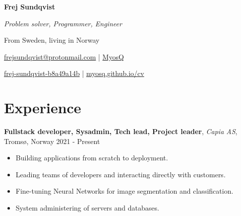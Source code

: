 \documentclass[11pt, a4paper]{article}
\begin{document}
\noindent
\begin{minipage}{0.25\textwidth}

\end{minipage}%
\begin{minipage}{0.75\textwidth}
    \centerline{
        \Large\bfseries Frej Sundqvist
    }
    \vspace{0.2em}
    \centerline{
        \textit{Problem solver, Programmer, Engineer}
    }
    \centerline{
        From Sweden, living in Norway
    }
    \vspace{0.5em}
    \centerline{
        {\faEnvelopeO} \href{mailto:frejsundqvist@protonmail.com}{frejsundqvist@protonmail.com}
        |
        {\faGithub} \href{https://github.com/MyosQ}{MyosQ}
    }
    \centerline{
        {\faLinkedin} \href{https://linkedin.com/in/frej-sundqvist-b8a49a14b}{frej-sundqvist-b8a49a14b}
        |
        {\faGlobe} \href{https://myosq.github.io/cv}{myosq.github.io/cv}    
    }
\end{minipage}

\vspace{1em}

\section*{Experience}
\textbf{Fullstack developer, Sysadmin, Tech lead, Project leader}, \textit{Capia AS}, Tromsø, Norway \hfill 2021 - Present
\begin{itemize}[noitemsep]
    \item Building applications from scratch to deployment.
    \item Leading teams of developers and interacting directly with customers.
    \item Fine-tuning Neural Networks for image segmentation and classification.
    \item System administering of servers and databases.
\end{itemize}
\end{document}
